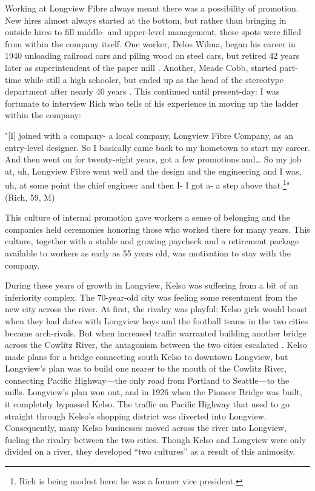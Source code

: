 Working at Longview Fibre always meant there was a possibility of promotion. New hires almost always started at the bottom, but rather than bringing in outside hires to fill middle- and upper-level management, these spots were filled from within the company itself. One worker, Delos Wilma, began his career in 1940 unloading railroad cars and piling wood on steel cars, but retired 42 years later as superintendent of the paper mill \citep[105]{wilma_2017}. Another, Meade Cobb, started part-time while still a high schooler, but ended up as the head of the stereotype department after nearly 40 years \citep[133]{wilma_2017}. This continued until present-day: I was fortunate to interview Rich who tells of his experience in moving up the ladder within the company:
\begin{num_quote}
    "[I] joined with a company- a local company, Longview Fibre Company, as an entry-level designer. So I basically came back to my hometown to start my career. And then went on for twenty-eight years, got a few promotions and… So my job at, uh, Longview Fibre went well and the design and the engineering and I was, uh, at some point the chief engineer and then I- I got a- a step above that.\footnote{Rich is being modest here: he was a former vice president.}" (Rich, 59, M)
    \label{quote:moving_up_coorporate_ladder}
\end{num_quote}
This culture of internal promotion gave workers a sense of belonging and the companies held ceremonies honoring those who worked there for many years. This culture, together with a stable and growing paycheck and a retirement package available to workers as early as 55 years old, was motivation to stay with the company.

During these years of growth in Longview, Kelso was suffering from a bit of an inferiority complex. The 70-year-old city was feeling some resentment from the new city across the river. At first, the rivalry was playful: Kelso girls would boast when they had dates with Longview boys and the football teams in the two cities became arch-rivals. But when increased traffic warranted building another bridge across the Cowlitz River, the antagonism between the two cities escalated \citep[154-155]{urrutia_1998}. Kelso made plans for a bridge connecting south Kelso to downtown Longview, but Longview's plan was to build one nearer to the mouth of the Cowlitz River, connecting Pacific Highway---the only road from Portland to Seattle—to the mills. Longview's plan won out, and in 1926 when the Pioneer Bridge was built, it completely bypassed Kelso. The traffic on Pacific Highway that used to go straight through Kelso's shopping district was diverted into Longview. Consequently, many Kelso businesses moved across the river into Longview, fueling the rivalry between the two cities. Though Kelso and Longview were only divided on a river, they developed “two cultures” \citep[xi]{wilma_2017} as a result of this animosity.

